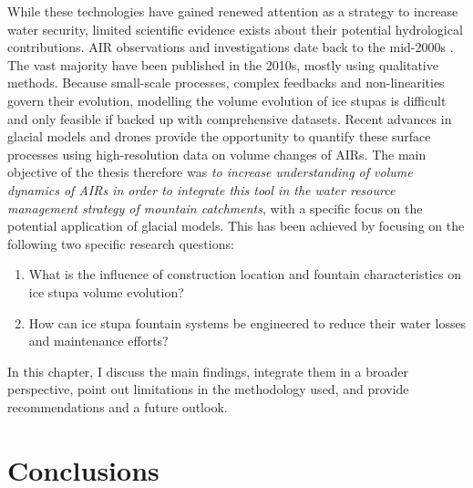 While these technologies have gained renewed attention as a strategy to increase water security, limited
scientific evidence exists about their potential hydrological contributions. AIR observations and investigations
date back to the mid-2000s \citep{tveitenGlacierGrowingLocal2007}. The vast majority have been published in the
2010s, mostly using qualitative methods. Because small-scale processes, complex feedbacks and non-linearities
govern their evolution, modelling the volume evolution of ice stupas is difficult and only feasible if backed up
with comprehensive datasets. Recent advances in glacial models and drones provide the opportunity to quantify
these surface processes using high-resolution data on volume changes of \ac{AIRs}. The main objective of the
thesis therefore was \textit{to increase understanding of volume dynamics of \ac{AIRs} in order to integrate
this tool in the water resource management strategy of mountain catchments}, with a specific focus on the
potential application of glacial models. This has been achieved by focusing on the following two specific
research questions:

\begin{enumerate}
  \item{What is the influence of construction location and fountain characteristics on ice stupa volume
    evolution?}
  \item{How can ice stupa fountain systems be engineered to reduce their water losses and maintenance efforts?}
\end{enumerate}

In this chapter, I discuss the main findings, integrate them in a broader perspective, point out limitations in
the methodology used, and provide recommendations and a future outlook.

\section{Conclusions}

